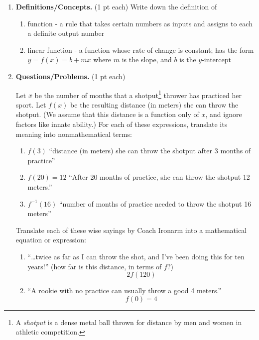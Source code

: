 \documentclass[11pt,letterpaper]{article}
\begin{document}
\begin{enumerate}
\item  \textbf{Definitions/Concepts.} (1 pt each) Write down the definition of
\begin{enumerate} 
\item function - a rule that takes certain numbers as inputs and assigns to each a definite output number
\vspace{.5pc}
\item linear function - a function whose rate of change is constant; has the form $y=f(x)=b+mx$ where $m$ is the slope, and $b$ is the $y$-intercept
\vspace{.5pc}
\end{enumerate}

\item \textbf{Questions/Problems.} (1 pt each) 

Let $x$ be the number of months
that a shotput\footnote{A {\it shotput} is a dense
metal ball
thrown for distance by men and women in athletic
competition.}
thrower has practiced her sport. Let $f(x)$ be the
resulting
distance (in meters) she can throw the shotput. (We
assume that
this distance is a function only of $x$, and ignore
factors like
innate ability.)
For each of these expressions, translate its meaning
into
nonmathematical terms:
\begin{enumerate}
\item $f(3)$ ``distance (in meters) she can throw the shotput after 3 months of practice'' 
\vspace{.5pc}
\item $f(20) = 12$ ``After 20 months of practice, she can throw the shotput 12 meters.'' 
\vspace{.5pc}
\item $f^{-1}(16)$ ``number of months of practice needed to throw the shotput 16 meters'' 
\vspace{.5pc}
\end{enumerate}
\noindent Translate each of these wise sayings by Coach Ironarm
into a
mathematical equation or expression: 
\begin{enumerate}
\item ``\ldots twice as far as I can throw the shot, and I've been doing this for ten years!'' (how far is this distance, in terms of $f$?)
\[2f(120)\]
\vspace{.5pc}
\item ``A rookie with no practice can usually throw a good 4 meters.'' 
\[f(0)=4\]
\vspace{.5pc}
\end{enumerate}


\end{enumerate}
\end{document}
